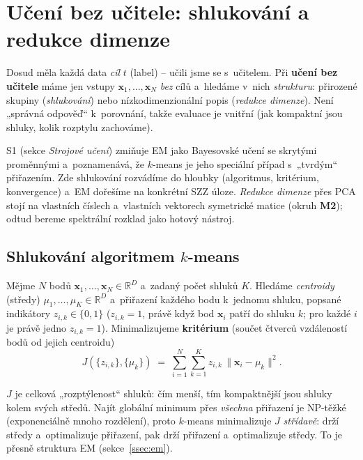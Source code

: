 \section{Učení bez učitele: shlukování a redukce dimenze}\label{sec:bezucitele}

Dosud měla každá data \emph{cíl} $t$ (label) -- učili jsme se s~učitelem. Při \textbf{učení bez učitele} máme jen vstupy $\mathbf{x}_1,\dots,\mathbf{x}_N$ \emph{bez} cílů a~hledáme v~nich \emph{strukturu}: přirozené skupiny (\emph{shlukování}) nebo nízkodimenzionální popis (\emph{redukce dimenze}). Není „správná odpověď`` k~porovnání, takže evaluace je vnitřní (jak kompaktní jsou shluky, kolik rozptylu zachováme).

\begin{poznamka}[Vztah k~S1 a~M2]
S1 (sekce \emph{Strojové učení}) zmiňuje EM jako Bayesovské učení se skrytými proměnnými a~poznamenává, že $k$-means je jeho speciální případ s~„tvrdým`` přiřazením. Zde shlukování rozvádíme do hloubky (algoritmus, kritérium, konvergence) a~EM dořešíme na konkrétní SZZ úloze. \emph{Redukce dimenze} přes PCA stojí na vlastních číslech a~vlastních vektorech symetrické matice (okruh \textbf{M2}); odtud bereme spektrální rozklad jako hotový nástroj.
\end{poznamka}

\subsection{Shlukování algoritmem \texorpdfstring{$k$}{k}-means}\label{ssec:kmeans}

\begin{definice}
Mějme $N$ bodů $\mathbf{x}_1,\dots,\mathbf{x}_N\in\mathbb{R}^D$ a~zadaný počet shluků $K$. Hledáme \emph{centroidy} (středy) $\mu_1,\dots,\mu_K\in\mathbb{R}^D$ a~přiřazení každého bodu k~jednomu shluku, popsané indikátory $z_{i,k}\in\{0,1\}$ ($z_{i,k}=1$, právě když bod $\mathbf{x}_i$ patří do shluku $k$; pro každé $i$ je právě jedno $z_{i,k}=1$). Minimalizujeme \textbf{kritérium} (součet čtverců vzdáleností bodů od jejich centroidu)
\[
  J(\{z_{i,k}\},\{\mu_k\}) \;=\; \sum_{i=1}^N\sum_{k=1}^K z_{i,k}\,\|\mathbf{x}_i-\mu_k\|^2 .
\]
\end{definice}

\begin{intuice}
$J$ je celková „rozptýlenost`` shluků: čím menší, tím kompaktnější jsou shluky kolem svých středů. Najít globální minimum přes \emph{všechna} přiřazení je NP-těžké (exponenciálně mnoho rozdělení), proto $k$-means minimalizuje $J$ \emph{střídavě}: drží středy a~optimalizuje přiřazení, pak drží přiřazení a~optimalizuje středy. To je přesně struktura EM (sekce~\ref{ssec:em}).
\end{intuice}

